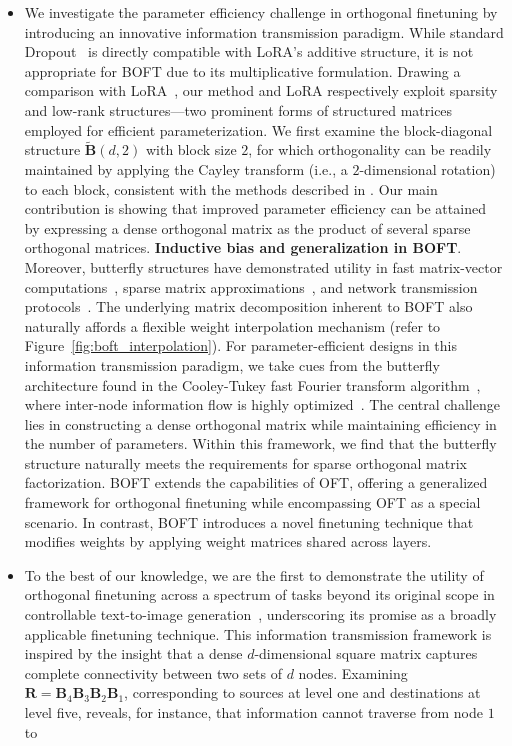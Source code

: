 \begin{itemize}[leftmargin=*,nosep]
    \item We investigate the parameter efficiency challenge in orthogonal finetuning by introducing an innovative information transmission paradigm. While standard Dropout~\cite{srivastava2014dropout} is directly compatible with LoRA's additive structure, it is not appropriate for BOFT due to its multiplicative formulation. Drawing a comparison with LoRA~\cite{hulora2022}, our method and LoRA respectively exploit sparsity and low-rank structures—two prominent forms of structured matrices~\cite{candes2011robust} employed for efficient parameterization. We first examine the block-diagonal structure $\tilde{\bm{B}}(d,2)$ with block size $2$, for which orthogonality can be readily maintained by applying the Cayley transform (i.e., a $2$-dimensional rotation) to each block, consistent with the methods described in \cite{liu2021orthogonal,qiu2023controlling}. Our main contribution is showing that improved parameter efficiency can be attained by expressing a dense orthogonal matrix as the product of several sparse orthogonal matrices. \textbf{Inductive bias and generalization in BOFT}. Moreover, butterfly structures have demonstrated utility in fast matrix-vector computations~\cite{michielssen1996multilevel,o2010algorithm}, sparse matrix approximations~\cite{li2015butterfly}, and network transmission protocols~\cite{klasing1994broadcasting,li2003linear,rajasingh2016transmission}. The underlying matrix decomposition inherent to BOFT also naturally affords a flexible weight interpolation mechanism (refer to Figure~\ref{fig:boft_interpolation}). For parameter-efficient designs in this information transmission paradigm, we take cues from the butterfly architecture found in the Cooley-Tukey fast Fourier transform algorithm~\cite{cooley1965algorithm}, where inter-node information flow is highly optimized~\cite{klasing1994broadcasting}. The central challenge lies in constructing a dense orthogonal matrix while maintaining efficiency in the number of parameters. Within this framework, we find that the butterfly structure naturally meets the requirements for sparse orthogonal matrix factorization. BOFT extends the capabilities of OFT, offering a generalized framework for orthogonal finetuning while encompassing OFT as a special scenario. In contrast, BOFT introduces a novel finetuning technique that modifies weights by applying weight matrices shared across layers. \item To the best of our knowledge, we are the first to demonstrate the utility of orthogonal finetuning across a spectrum of tasks beyond its original scope in controllable text-to-image generation~\cite{qiu2023controlling}, underscoring its promise as a broadly applicable finetuning technique. This information transmission framework is inspired by the insight that a dense $d$-dimensional square matrix captures complete connectivity between two sets of $d$ nodes. Examining $\bm{R}=\bm{B}_4\bm{B}_3\bm{B}_2\bm{B}_1$, corresponding to sources at level one and destinations at level five, reveals, for instance, that information cannot traverse from node $1$ to 
\end{itemize}
